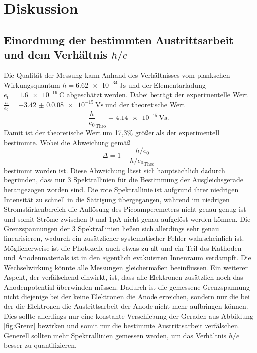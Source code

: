 \section{Diskussion}
\label{sec:Diskussion}
\subsection{Einordnung der bestimmten Austrittsarbeit und dem Verhältnis $h/e$}
Die Qualität der Messung kann Anhand des Verhältnisses vom plankschen Wirkungsquantum $h=\qty{6.62e-34}{\joule\second}$ und
der Elementarladung $e_0=\qty{1.6e-19}{\coulomb}$ abgeschätzt werden. Dabei beträgt der experimentelle Wert $\frac{h}{e_0}=\qty{-3.42(0.008)e-15}{\volt\second}$ und der theoretische Wert
\begin{equation}
    \frac{h}{e_0}_\text{Theo}=\qty{4.14e-15}{\volt\second}.
\end{equation}
Damit ist der theoretische Wert um 17,3\% größer als der experimentell bestimmte. Wobei die Abweichung gemäß
\begin{equation}
    \Delta = 1-\frac{h/e_0}{h/{e_0}_\text{Theo}}
\end{equation}
bestimmt worden ist.
Diese Abweichung lässt sich hauptsächlich dadurch begründen, dass nur 3 Spektrallinien für die Bestimmung der Ausgleichsgerade herangezogen worden sind.
Die rote Spektrallinie ist aufgrund ihrer niedrigen Intensität zu schnell in die Sättigung übergegangen, während im niedrigen Stromstärkenbereich die Auflösung des Picoamperemeters
nicht genau genug ist und somit Ströme zwischen 0 und 1pA nicht genau aufgelöst werden können. Die Grenzspannungen der 3 Spektrallinien ließen sich allerdings sehr genau linearisieren, 
wodurch ein zusätzlicher systematischer Fehler wahrscheinlich ist. Möglicherweise ist die Photozelle auch etwas zu alt und ein Teil des Kathoden- und Anodenmaterials ist in den
eigentlich evakuierten Innenraum verdampft. Die Wechselwirkung könnte alle Messungen gleichermaßen beeinflussen. Ein weiterer Aspekt, der verfälschend einwirkt, ist, dass
alle Elektronen	zusätzlich noch das Anodenpotential überwinden müssen. Dadurch ist die gemessene Grenzspannung nicht diejenige
bei der keine Elektronen die Anode erreichen, sondern nur die bei der die Elektronen die Austrittsarbeit der Anode nicht mehr aufbringen können.
Dies sollte allerdings nur eine konstante Verschiebung der Geraden aus Abbildung \ref{fig:Grenz} bewirken und somit nur die bestimmte Austrittsarbeit verfälschen.
Generell sollten mehr Spektrallinien gemessen werden, um das Verhältnis $h/e$ besser zu quantifizieren.
